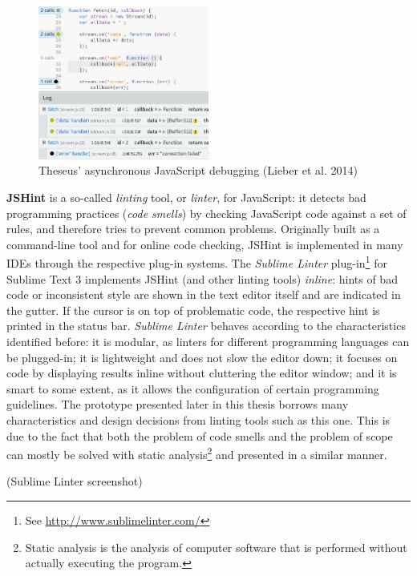 \begin{figure}[htbp]
\centering
\includegraphics[keepaspectratio,width=0.5\textwidth]{img/theseus.jpg}
\caption{Theseus’ asynchronous JavaScript debugging (Lieber et al. 2014)}
\label{fig:theseus}
\end{figure}

\textbf{JSHint} is a so-called \emph{linting} tool, or \emph{linter},
for JavaScript: it detects bad programming practices (\emph{code
smells}) by checking JavaScript code against a set of rules, and
therefore tries to prevent common problems. Originally built as a
command-line tool and for online code checking, JSHint is implemented in
many IDEs through the respective plug-in systems. The \emph{Sublime
Linter} plug-in\footnote{See \url{http://www.sublimelinter.com/}} for
Sublime Text 3 implements JSHint (and other linting tools)
\emph{inline}: hints of bad code or inconsistent style are shown in the
text editor itself and are indicated in the gutter. If the cursor is on
top of problematic code, the respective hint is printed in the status
bar. \emph{Sublime Linter} behaves according to the characteristics
identified before: it is modular, as linters for different programming
languages can be plugged-in; it is lightweight and does not slow the
editor down; it focuses on code by displaying results inline without
cluttering the editor window; and it is smart to some extent, as it
allows the configuration of certain programming guidelines. The
prototype presented later in this thesis borrows many characteristics
and design decisions from linting tools such as this one. This is due to
the fact that both the problem of code smells and the problem of scope
can mostly be solved with static
analysis\footnote{Static analysis is the analysis of computer software that is performed without actually executing the program.}
and presented in a similar manner.

(Sublime Linter screenshot)

